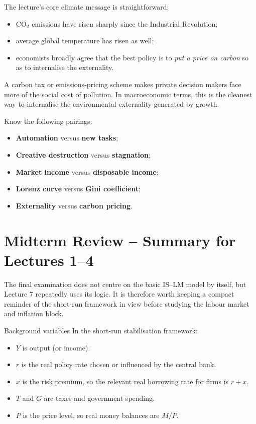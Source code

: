 \documentclass[12pt]{article}
\begin{document}
The lecture's core climate message is straightforward:
\begin{itemize}[leftmargin=1.5em]
\item CO\(_2\) emissions have risen sharply since the Industrial Revolution;
\item average global temperature has risen as well;
\item economists broadly agree that the best policy is to \emph{put a price on carbon} so as to internalise the externality.
\end{itemize}

\begin{policynote}[title={Policy Application: Carbon pricing}]
A carbon tax or emissions-pricing scheme makes private decision makers face more of the social cost of pollution. In macroeconomic terms, this is the cleanest way to internalise the environmental externality generated by growth.
\end{policynote}

\begin{examtip}[title={Exam Focus: Likely MCQ-only checklist}]
Know the following pairings:
\begin{itemize}[leftmargin=1.5em]
\item \textbf{Automation} versus \textbf{new tasks};
\item \textbf{Creative destruction} versus \textbf{stagnation};
\item \textbf{Market income} versus \textbf{disposable income};
\item \textbf{Lorenz curve} versus \textbf{Gini coefficient};
\item \textbf{Externality} versus \textbf{carbon pricing}.
\end{itemize}
\end{examtip}

\section{Midterm Review -- Summary for Lectures 1--4}

The final examination does not centre on the basic IS--LM model by itself, but Lecture 7 repeatedly uses its logic. It is therefore worth keeping a compact reminder of the short-run framework in view before studying the labour market and inflation block.

\begin{definition}{Background variables}{}
In the short-run stabilisation framework:
\begin{itemize}[leftmargin=1.5em]
\item $Y$ is output (or income).
\item $r$ is the real policy rate chosen or influenced by the central bank.
\item $x$ is the risk premium, so the relevant real borrowing rate for firms is $r+x$.
\item $T$ and $G$ are taxes and government spending.
\item $P$ is the price level, so real money balances are $M/P$.
\end{itemize}
\end{definition}
\end{document}
